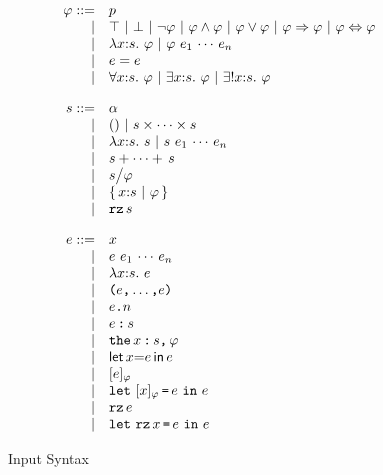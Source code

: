 \newcommand{\iprods}[2]{#1\times\cdots\times#2}
\newcommand{\isums}[2]{#1+\cdots+\,#2}
\newcommand{\iquot}[2]{#1{\bigm/} #2}
\newcommand{\isubset}[3]{\{\,#1{:}#2\ |\ #3\,\}}

\begin{figure}
	\[
	\begin{array}{rll}
		\ip ::= 
		    & \iP\\
		  | & \itrue \ | \ \ifalse\ |\ \inot{\ip}\ |\ \iands{\ip}{\ip}\ |\ 
		       \iors{\ip}{\ip}\ | \ \iimply{\ip}{\ip}\ |\ \iiff{\ip}{\ip}\\
		  | & \ilambda{\ix}{\is}{\ip} \ |\ \iapps{\ip}{\ie_1}{\ie_n}\\
		  | & \iequal{\ie}{\ie}\\
		  | & \iforall{\ix}{\is}{\ip} \ |\ 
		      \iexists{\ix}{\is}{\ip} \ |\
		      \iunique{\ix}{\is}{\ip}\\[10pt]
		
		\is ::= 
		    & \iS\\
		  | & ()\ |\ \iprods{\is}{\is}\\
		  | & \ilambda{\ix}{\is}{\is}\ |\ 
		      \iapps{\is}{\ie_1}{\ie_n}\\
		  | & \isums{\is}{\is}\\
		  | & \iquot{\is}{\ip}\\
		  | & \isubset{\ix}{\is}{\ip}\\
		  | & \irz{\is}\\[10pt] 
		
	
		\ie ::=
		    & \ix\\
		  | & \iapps{\ie}{\ie_1}{\ie_n}\\
		  | & \ilambda{\ix}{\is}{\ie}\\
		  | & \ituples{\ie}{\ie}\\
		  | & \iproj{\ie}{n}\\
		  | & \iconstrain{\ie}{\is}\\
		  | & \ithe{\ix}{\is}{\ip}\\
		  | & \ilet{\ix}{\ie}{\ie}\\
		  | & \ieclass{\ie}{\ip}\\
		  | & \ileteclass{\ix}{\ip}{\ie}{\ie}\\
		  | & \irz{\ie}\\
		  | & \iletrz{\ix}{\ie}{\ie}\\
	\end{array}
	\]
	\label{fig:input}
	\caption{Input Syntax}
\end{figure}



